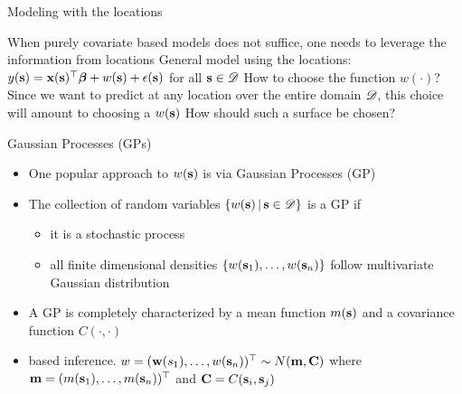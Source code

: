 
\begin{frame}{Modeling with the locations}
	\begin{itemize}
		\myitem When purely covariate based models does not suffice, one needs to leverage the information from locations
		\myitem General model using the locations: $y(\textbf{s})=\textbf{x}(\textbf{s})^\top\mbox{\boldmath $ \beta $} + w(\textbf{s}) + \epsilon(\textbf{s})$ for all $\textbf{s} \in {\cal D}$
		\myitem How to choose the function $w(\cdot)$?
		\myitem Since we want to predict at any location over the entire domain ${\cal D}$, this choice will amount to choosing a  $w(\textbf{s})$
		\myitem How should such a surface be chosen? 
	\end{itemize}
\end{frame}

\begin{frame}{Gaussian Processes (GPs)}
	\begin{itemize}
		\item One popular approach to  $w(\textbf{s})$ is via Gaussian Processes (GP)
		\item The collection of random variables $\{w(\textbf{s}) \,|\, \textbf{s}\in {\cal D}\}$ is a GP if 
		\begin{itemize}
			\item it is a  stochastic process
			\item all finite dimensional densities $\{w(\textbf{s}_1),\ldots,w(\textbf{s}_n)\}$ follow multivariate Gaussian distribution
		\end{itemize}
		\item A GP is completely characterized by a mean function $m(\textbf{s})$ and a covariance function $C(\cdot,\cdot)$
		\item {}  based inference. $w=(\textbf{w}(s_1),\ldots,w(\textbf{s}_n))^\top \sim N(\textbf{m},\textbf{C})$ where $\textbf{m}=(m(\textbf{s}_1),\ldots,m(\textbf{s}_n))^\top$ and $\textbf{C}=C(\textbf{s}_i,\textbf{s}_j)$
	\end{itemize}
\end{frame}


